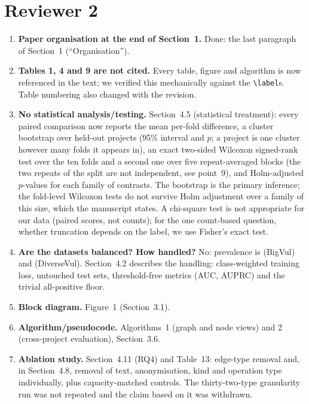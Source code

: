 \documentclass[11pt]{article}
\newcommand{\sect}[1]{Section~#1}
\begin{document}
\section*{Reviewer 2}
\begin{enumerate}[leftmargin=*, label=\textbf{\arabic*.}]

\item \textbf{Paper organisation at the end of Section~1.}
Done: the last paragraph of \sect{1} (``Organisation'').

\item \textbf{Tables 1, 4 and 9 are not cited.}
Every table, figure and algorithm is now referenced in the text; we verified
this mechanically against the \texttt{\textbackslash label}s. Table numbering
also changed with the revision.

\item \textbf{No statistical analysis/testing.}
\sect{4.5} (statistical treatment): every paired comparison now reports the
mean per-fold difference, a cluster bootstrap over held-out projects (95\%
interval and $p$; a project is one cluster however many folds it appears in),
an exact two-sided Wilcoxon signed-rank test over the ten folds and a second one
over five repeat-averaged blocks (the two repeats of the split are not
independent, see point~9), and Holm-adjusted $p$-values for each family of
contrasts. The bootstrap is the primary inference; the fold-level Wilcoxon tests
do not survive Holm adjustment over a family of this size, which the manuscript
states. A chi-square test is not appropriate for
our data (paired scores, not counts); for the one count-based question, whether
truncation depends on the label, we use Fisher's exact test.

\item \textbf{Are the datasets balanced? How handled?}
No: prevalence is \numbigvulPrev{} (BigVul) and \numdiversevulPrev{}
(DiverseVul). \sect{4.2} describes the handling: class-weighted training loss,
untouched test sets, threshold-free metrics (AUC, AUPRC) and the trivial
all-positive floor.

\item \textbf{Block diagram.} Figure~1 (\sect{3.1}).

\item \textbf{Algorithm/pseudocode.} Algorithms~1 (graph and node views) and 2
(cross-project evaluation), \sect{3.6}.

\item \textbf{Ablation study.} \sect{4.11} (RQ4) and Table~13: edge-type removal and, in \sect{4.8}, removal of text,
anonymisation, kind and operation type individually, plus capacity-matched
controls. The thirty-two-type granularity run was not repeated and the claim
based on it was withdrawn.


\end{enumerate}
\end{document}

